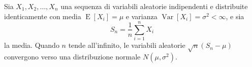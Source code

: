\documentclass{article}
\begin{document}
Sia $X_1, X_2, \ldots, X_n$ una sequenza di variabili aleatorie indipendenti e distribuite identicamente con media $\operatorname{E}[X_i] = \mu$ e varianza
$\operatorname{Var}[X_i] = \sigma^2 < \infty$, e sia
\begin{equation*}
S_n = \frac{1}{n}\sum_{i=1}^{n} X_i
\end{equation*}
la media. Quando $n$ tende all'infinito, le variabili aleatorie
$\sqrt{n}(S_n - \mu)$ convergono verso una distribuzione normale $N(\mu, \sigma^2)$.

\end{document}
